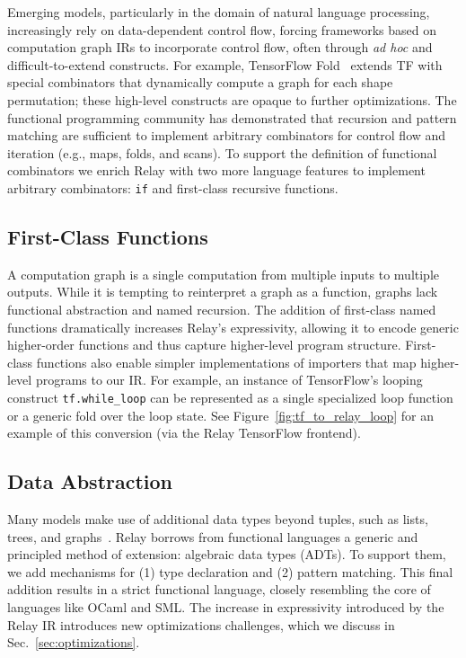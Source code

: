   Emerging models, particularly in the domain of natural language processing, increasingly
    rely on data-dependent control flow, forcing frameworks based on computation graph IRs
    to incorporate control flow, often through \textit{ad hoc} and difficult-to-extend constructs.
  For example, TensorFlow Fold~\citep{tf_fold} extends TF with special combinators that
    dynamically compute a graph for each shape permutation;
    these high-level constructs are opaque to further optimizations.
  The functional programming community has demonstrated that recursion and pattern matching are sufficient
    to implement arbitrary combinators for control flow and iteration (e.g., maps, folds, and scans).
  To support the definition of functional combinators
    we enrich Relay with two more language
    features to implement arbitrary combinators: \verb|if| and first-class recursive functions.

  \subsection*{First-Class Functions}

  A computation graph is a single computation
    from multiple inputs to multiple outputs.
  While it is tempting to reinterpret a graph as a function,
    graphs lack functional abstraction and named recursion.
  The addition of first-class named functions dramatically increases
    Relay's expressivity, allowing it to encode generic
    higher-order functions and thus capture higher-level program structure.
  First-class functions also enable simpler implementations
    of importers that map higher-level programs to our IR.
  For example, an instance of TensorFlow's looping construct \verb|tf.while_loop|
    can be represented as a single specialized loop function
    or a generic fold over the loop state.
  See Figure~\ref{fig:tf_to_relay_loop} for an example of this conversion (via
    the Relay TensorFlow frontend).

  \subsection*{Data Abstraction}
  Many models make use of additional data types beyond
    tuples, such as lists, trees, and graphs~\citep{char-rnn, tree_lstm, graph_lstm}.
  Relay borrows from functional languages
    a generic and principled method of extension:
    algebraic data types (ADTs).
  To support them, we add mechanisms for
    (1) type declaration and
    (2) pattern matching.
  This final addition results in a strict functional language,
    closely resembling the core of languages like OCaml and SML.
  The increase in expressivity introduced by the Relay IR introduces
    new optimizations challenges, which we
    discuss in Sec.~\ref{sec:optimizations}.

